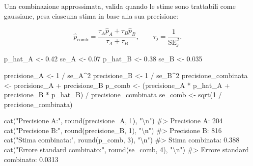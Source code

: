 \documentclass[
  italian,
  letterpaper,
  a4paper,
  11pt,
  open=any]{scrbook}
\newenvironment{Shaded}{\begin{snugshade}}{\end{snugshade}}
\newcommand{\CommentTok}[1]{\textcolor[rgb]{0.37,0.37,0.37}{#1}}
\newcommand{\DecValTok}[1]{\textcolor[rgb]{0.68,0.00,0.00}{#1}}
\newcommand{\FloatTok}[1]{\textcolor[rgb]{0.68,0.00,0.00}{#1}}
\newcommand{\FunctionTok}[1]{\textcolor[rgb]{0.28,0.35,0.67}{#1}}
\newcommand{\NormalTok}[1]{\textcolor[rgb]{0.00,0.23,0.31}{#1}}
\newcommand{\OtherTok}[1]{\textcolor[rgb]{0.00,0.23,0.31}{#1}}
\newcommand{\SpecialCharTok}[1]{\textcolor[rgb]{0.37,0.37,0.37}{#1}}
\newcommand{\StringTok}[1]{\textcolor[rgb]{0.13,0.47,0.30}{#1}}
\theoremstyle{plain}
\theoremstyle{definition}
\theoremstyle{definition}
\theoremstyle{remark}
\begin{document}
Una combinazione approssimata, valida quando le stime sono trattabili
come gaussiane, pesa ciascuna stima in base alla sua precisione:

\[
\hat{p}_{\text{comb}} =
\frac{\tau_A \hat{p}_A + \tau_B \hat{p}_B}{\tau_A + \tau_B},
\qquad
\tau_j = \frac{1}{\text{SE}_j^2}.
\]

\begin{Shaded}
\begin{Highlighting}[]
\NormalTok{p\_hat\_A }\OtherTok{\textless{}{-}} \FloatTok{0.42}
\NormalTok{se\_A }\OtherTok{\textless{}{-}} \FloatTok{0.07}
\NormalTok{p\_hat\_B }\OtherTok{\textless{}{-}} \FloatTok{0.38}
\NormalTok{se\_B }\OtherTok{\textless{}{-}} \FloatTok{0.035}

\NormalTok{precisione\_A }\OtherTok{\textless{}{-}} \DecValTok{1} \SpecialCharTok{/}\NormalTok{ se\_A}\SpecialCharTok{\^{}}\DecValTok{2}
\NormalTok{precisione\_B }\OtherTok{\textless{}{-}} \DecValTok{1} \SpecialCharTok{/}\NormalTok{ se\_B}\SpecialCharTok{\^{}}\DecValTok{2}
\NormalTok{precisione\_combinata }\OtherTok{\textless{}{-}}\NormalTok{ precisione\_A }\SpecialCharTok{+}\NormalTok{ precisione\_B}
\NormalTok{p\_comb }\OtherTok{\textless{}{-}}\NormalTok{ (precisione\_A }\SpecialCharTok{*}\NormalTok{ p\_hat\_A }\SpecialCharTok{+}\NormalTok{ precisione\_B }\SpecialCharTok{*}\NormalTok{ p\_hat\_B) }\SpecialCharTok{/}\NormalTok{ precisione\_combinata}
\NormalTok{se\_comb }\OtherTok{\textless{}{-}} \FunctionTok{sqrt}\NormalTok{(}\DecValTok{1} \SpecialCharTok{/}\NormalTok{ precisione\_combinata)}

\FunctionTok{cat}\NormalTok{(}\StringTok{"Precisione A:"}\NormalTok{, }\FunctionTok{round}\NormalTok{(precisione\_A, }\DecValTok{1}\NormalTok{), }\StringTok{"}\SpecialCharTok{\textbackslash{}n}\StringTok{"}\NormalTok{)}
\CommentTok{\#\textgreater{} Precisione A: 204}
\FunctionTok{cat}\NormalTok{(}\StringTok{"Precisione B:"}\NormalTok{, }\FunctionTok{round}\NormalTok{(precisione\_B, }\DecValTok{1}\NormalTok{), }\StringTok{"}\SpecialCharTok{\textbackslash{}n}\StringTok{"}\NormalTok{)}
\CommentTok{\#\textgreater{} Precisione B: 816}
\FunctionTok{cat}\NormalTok{(}\StringTok{"Stima combinata:"}\NormalTok{, }\FunctionTok{round}\NormalTok{(p\_comb, }\DecValTok{3}\NormalTok{), }\StringTok{"}\SpecialCharTok{\textbackslash{}n}\StringTok{"}\NormalTok{)}
\CommentTok{\#\textgreater{} Stima combinata: 0.388}
\FunctionTok{cat}\NormalTok{(}\StringTok{"Errore standard combinato:"}\NormalTok{, }\FunctionTok{round}\NormalTok{(se\_comb, }\DecValTok{4}\NormalTok{), }\StringTok{"}\SpecialCharTok{\textbackslash{}n}\StringTok{"}\NormalTok{)}
\CommentTok{\#\textgreater{} Errore standard combinato: 0.0313}
\end{Highlighting}
\end{Shaded}
\end{document}

